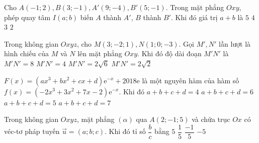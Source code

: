 \begin{ex}%
	Cho $A(-1;2), B(3;-1), A'(9;-4), B'(5;-1)$. Trong mặt phẳng $Oxy$, phép quay tâm $I(a;b)$ biến $A$ thành $A'$, $B$ thành $B'$. Khi đó giá trị $a+b$ là
	\choice
	{ $5 $}
	{$4$}
	{\True $3$}
	{$2$}
\end{ex}
\begin{ex}%
	Trong không gian $Oxyz$, cho $M(3;-2;1), N(1;0;-3)$. Gọi $M', N'$ lần lượt là hình chiếu của $M$ và $N$ lên mặt phẳng $Oxy$. Khi đó độ dài đoạn $M'N'$ là
	\choice
	{ $M'N'=8 $}
	{$M'N'=4$}
	{$M'N'=2\sqrt{6}$}
	{\True $M'N'=2\sqrt{2}$}
\end{ex}
\begin{ex}%
	$F(x)=(ax^3+bx^2+cx+d)\mathrm{e}^{-x}+2018\mathrm{e}$ là một nguyên hàm của hàm số $f(x)=(-2x^3+3x^2+7x-2)\mathrm{e}^{-x}$. Khi đó
	\choice
	{ $a+b+c+d=4 $}
	{$a+b+c+d=6$}
	{\True $a+b+c+d=5$}
	{$a+b+c+d=7$}
\end{ex}
\begin{ex}%
	Trong không gian $Oxyz$, mặt phẳng $(\alpha)$ qua $A(2;-1;5)$ và chứa trục $Ox$ có véc-tơ pháp tuyến $\vec{u}=(a;b;c)$. Khi đó tỉ số $\dfrac{b}{c}$ bằng
	\choice
	{\True $5 $}
	{$\dfrac{1}{5}$}
	{$\dfrac{-1}{5} $}
	{$-5$}
\end{ex}
